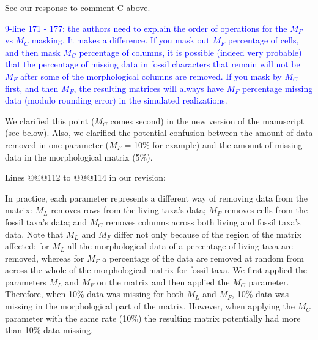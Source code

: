\documentclass[11pt]{letter}
\begin{document}
\begin{letter}{}
See our response to comment C above.



\textcolor{blue}{9-line 171 - 177: the authors need to explain the order of operations for the $M_F$ vs $M_C$ masking. It makes a difference. If you mask out $M_F$ percentage of cells, and then mask $M_C$ percentage of columns, it is possible (indeed very probable) that the percentage of missing data in fossil characters that remain will not be $M_F$ after some of the morphological columns are removed. If you mask by $M_C$ first, and then $M_F$, the resulting matrices will always have $M_F$ percentage missing data (modulo rounding error) in the simulated realizations.}

We clarified this point ($M_C$ comes second) in the new version of the manuscript (see below). Also, we clarified the potential confusion between the amount of data removed in one parameter ($M_F$ = 10\% for example) and the amount of missing data in the morphological matrix (5\%).

Lines @@@112 to @@@114 in our revision: 

\hfill\begin{minipage}{\dimexpr\textwidth-1cm}
In practice, each parameter represents a different way of removing data from the matrix: $M_L$ removes rows from the living taxa's data; $M_F$ removes cells from the fossil taxa's data; and $M_C$ removes columns across both living and fossil taxa's data. Note that $M_L$ and $M_F$ differ not only because of the region of the matrix affected: for $M_L$ all the morphological data of a percentage of living taxa are removed, whereas for $M_F$ a percentage of the data are removed at random from across the whole of the morphological matrix for fossil taxa. We first applied the parameters $M_L$ and $M_F$ on the matrix and then applied the $M_C$ parameter. Therefore, when 10\% data was missing for both $M_L$ and $M_F$, 10\% data was missing in the morphological part of the matrix. However, when applying the $M_C$ parameter with the same rate (10\%) the resulting matrix potentially had more than 10\% data missing.
\end{minipage}


\end{letter}
\end{document}
